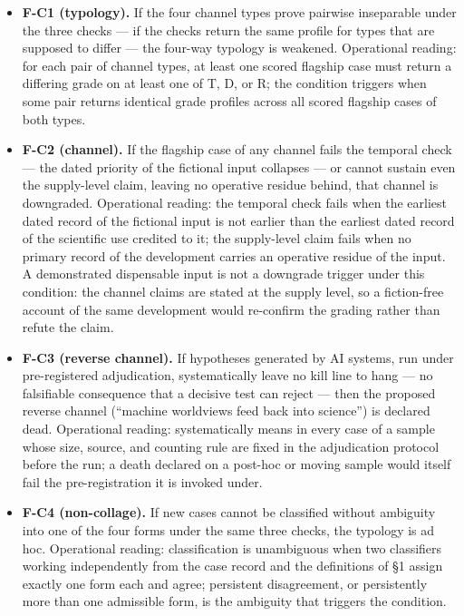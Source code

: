 \documentclass[11pt,a4paper]{article}
\begin{document}
\begin{itemize}[leftmargin=1.6em,itemsep=2pt,parsep=0pt,topsep=3pt]
\item \textbf{F-C1 (typology).} If the four channel types prove pairwise inseparable under the three checks — if the checks return the same profile for types that are supposed to differ — the four-way typology is weakened. Operational reading: for each pair of channel types, at least one scored flagship case must return a differing grade on at least one of T, D, or R; the condition triggers when some pair returns identical grade profiles across all scored flagship cases of both types.
\item \textbf{F-C2 (channel).} If the flagship case of any channel fails the temporal check — the dated priority of the fictional input collapses — or cannot sustain even the supply-level claim, leaving no operative residue behind, that channel is downgraded. Operational reading: the temporal check fails when the earliest dated record of the fictional input is not earlier than the earliest dated record of the scientific use credited to it; the supply-level claim fails when no primary record of the development carries an operative residue of the input. A demonstrated dispensable input is not a downgrade trigger under this condition: the channel claims are stated at the supply level, so a fiction-free account of the same development would re-confirm the grading rather than refute the claim.
\item \textbf{F-C3 (reverse channel).} If hypotheses generated by AI systems, run under pre-registered adjudication, systematically leave no kill line to hang — no falsifiable consequence that a decisive test can reject — then the proposed reverse channel (``machine worldviews feed back into science'') is declared dead. Operational reading: systematically means in every case of a sample whose size, source, and counting rule are fixed in the adjudication protocol before the run; a death declared on a post-hoc or moving sample would itself fail the pre-registration it is invoked under.
\item \textbf{F-C4 (non-collage).} If new cases cannot be classified without ambiguity into one of the four forms under the same three checks, the typology is ad hoc. Operational reading: classification is unambiguous when two classifiers working independently from the case record and the definitions of §1 assign exactly one form each and agree; persistent disagreement, or persistently more than one admissible form, is the ambiguity that triggers the condition.
\end{itemize}
\end{document}
